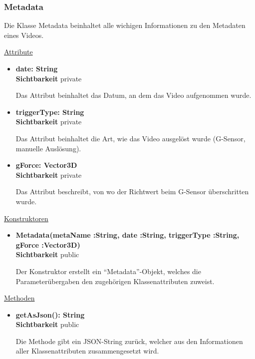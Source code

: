 \subsubsection{Metadata}
Die Klasse Metadata beinhaltet alle wichigen Informationen zu den Metadaten eines Videos. \newline

\underline{Attribute}
\begin{itemize}
\itemsep0pt
\item \textbf{date: String} \hfill\\ 
\textbf{Sichtbarkeit} private 

Das Attribut beinhaltet das Datum, an dem das Video aufgenommen wurde.

\item \textbf{triggerType: String} \hfill\\ 
\textbf{Sichtbarkeit} private 

Das Attribut beinhaltet die Art, wie das Video ausgelöst wurde (G-Sensor, manuelle Auslösung). 

\item \textbf{gForce: Vector3D} \hfill\\ 
\textbf{Sichtbarkeit} private 

Das Attribut beschreibt, von wo der Richtwert beim G-Sensor überschritten wurde.

\end{itemize}

\underline{Konstruktoren}
\begin{itemize}
\itemsep0pt
\item \textbf{Metadata(metaName :String, date :String, triggerType :String, gForce :Vector3D)} \hfill\\
\textbf{Sichtbarkeit} public 

Der Konstruktor erstellt ein ``Metadata''-Objekt, welches die Parameterübergaben den zugehörigen Klassenattributen zuweist.

\end{itemize}

\underline{Methoden}
\begin{itemize}
\itemsep0pt
\item \textbf{getAsJson(): String}\hfill\\
\textbf{Sichtbarkeit} public 

Die Methode gibt ein JSON-String zurück, welcher aus den Informationen aller Klassenattributen zusammengesetzt wird.

\end{itemize}